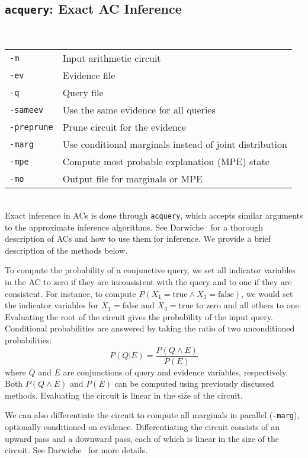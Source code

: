 \documentclass[11pt]{article}
\begin{document}
\subsection{{\tt acquery}: Exact AC Inference} \label{sec:acquery}

\noindent {} \\
\begin{tabular}{ll}
{\tt -m} &         Input arithmetic circuit \\
{\tt -ev} &        Evidence file \\
{\tt -q} &         Query file \\
{\tt -sameev} &    Use the same evidence for all queries \\
{\tt -preprune} &  Prune circuit for the evidence \\
{\tt -marg} &      Use conditional marginals instead of joint distribution \\
{\tt -mpe} &       Compute most probable explanation (MPE) state \\
{\tt -mo} &        Output file for marginals or MPE \\
\end{tabular} \\

Exact inference in ACs is done through {\tt acquery}, which accepts
similar arguments to the approximate inference algorithms. See
Darwiche~\cite{darwiche03} for a thorough description of ACs and how
to use them for inference.  We provide a brief description of the
methods below.

To compute the probability of a conjunctive query, we set all
indicator variables in the AC to zero if they are inconsistent with
the query and to one if they are consistent.  For instance, to compute
$P(X_1 = \text{true} \wedge X_3 = \text{false})$, we would set the
indicator variables for $X_1=\text{false}$ and $X_3=\text{true}$ to
zero and all others to one.  Evaluating the root of the circuit gives
the probability of the input query.  Conditional probabilities are
answered by taking the ratio of two unconditioned probabilities:
\[
P(Q|E) = \frac{P(Q \wedge E)}{P(E)}
\]
where $Q$ and $E$ are conjunctions of query and evidence variables,
respectively.  Both $P(Q \wedge E)$ and $P(E)$ can be computed using
previously discussed methods.  Evaluating the circuit is linear in the
size of the circuit.

We can also differentiate the circuit to compute all marginals in
parallel ({\tt -marg}), optionally conditioned on evidence.
Differentiating the circuit consists of an upward pass and a downward
pass, each of which is linear in the size of the circuit.  See
Darwiche~\cite{darwiche03} for more details.
\end{document}
